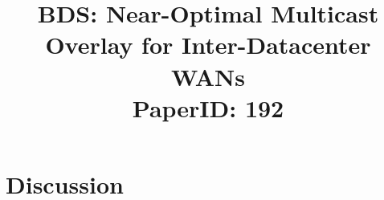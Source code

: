 \documentclass[letterpaper,twocolumn,10pt]{article}
\newcommand{\name}{BDS\xspace}
\begin{document}
{\title{\name: Near-Optimal Multicast Overlay for Inter-Datacenter WANs\\
\vspace{0.5cm}
\normalsize{PaperID: 192} \vspace{-1cm}}

\maketitle












%

%

%


%
%
%
%
%
%
%
%

%
%
%
%

\section{Discussion}

}
\end{document}
